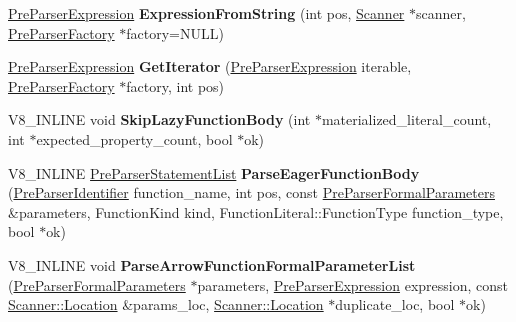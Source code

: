 \begin{DoxyCompactItemize}
\item 
\hyperlink{classv8_1_1internal_1_1_pre_parser_expression}{Pre\+Parser\+Expression} {\bfseries Expression\+From\+String} (int pos, \hyperlink{classv8_1_1internal_1_1_scanner}{Scanner} $\ast$scanner, \hyperlink{classv8_1_1internal_1_1_pre_parser_factory}{Pre\+Parser\+Factory} $\ast$factory=N\+U\+LL)\hypertarget{classv8_1_1internal_1_1_pre_parser_traits_a1ccbffc910f113613cdb48aeef0a8a7b}{}\label{classv8_1_1internal_1_1_pre_parser_traits_a1ccbffc910f113613cdb48aeef0a8a7b}

\item 
\hyperlink{classv8_1_1internal_1_1_pre_parser_expression}{Pre\+Parser\+Expression} {\bfseries Get\+Iterator} (\hyperlink{classv8_1_1internal_1_1_pre_parser_expression}{Pre\+Parser\+Expression} iterable, \hyperlink{classv8_1_1internal_1_1_pre_parser_factory}{Pre\+Parser\+Factory} $\ast$factory, int pos)\hypertarget{classv8_1_1internal_1_1_pre_parser_traits_a3c71f9a7541afb464a3e3766b78cded4}{}\label{classv8_1_1internal_1_1_pre_parser_traits_a3c71f9a7541afb464a3e3766b78cded4}

\item 
V8\+\_\+\+I\+N\+L\+I\+NE void {\bfseries Skip\+Lazy\+Function\+Body} (int $\ast$materialized\+\_\+literal\+\_\+count, int $\ast$expected\+\_\+property\+\_\+count, bool $\ast$ok)\hypertarget{classv8_1_1internal_1_1_pre_parser_traits_a44d0f342c2e7912190f30c05229afcba}{}\label{classv8_1_1internal_1_1_pre_parser_traits_a44d0f342c2e7912190f30c05229afcba}

\item 
V8\+\_\+\+I\+N\+L\+I\+NE \hyperlink{classv8_1_1internal_1_1_pre_parser_list}{Pre\+Parser\+Statement\+List} {\bfseries Parse\+Eager\+Function\+Body} (\hyperlink{classv8_1_1internal_1_1_pre_parser_identifier}{Pre\+Parser\+Identifier} function\+\_\+name, int pos, const \hyperlink{structv8_1_1internal_1_1_pre_parser_formal_parameters}{Pre\+Parser\+Formal\+Parameters} \&parameters, Function\+Kind kind, Function\+Literal\+::\+Function\+Type function\+\_\+type, bool $\ast$ok)\hypertarget{classv8_1_1internal_1_1_pre_parser_traits_a946b995ba60d63afe01dd3ad745f81d0}{}\label{classv8_1_1internal_1_1_pre_parser_traits_a946b995ba60d63afe01dd3ad745f81d0}

\item 
V8\+\_\+\+I\+N\+L\+I\+NE void {\bfseries Parse\+Arrow\+Function\+Formal\+Parameter\+List} (\hyperlink{structv8_1_1internal_1_1_pre_parser_formal_parameters}{Pre\+Parser\+Formal\+Parameters} $\ast$parameters, \hyperlink{classv8_1_1internal_1_1_pre_parser_expression}{Pre\+Parser\+Expression} expression, const \hyperlink{structv8_1_1internal_1_1_scanner_1_1_location}{Scanner\+::\+Location} \&params\+\_\+loc, \hyperlink{structv8_1_1internal_1_1_scanner_1_1_location}{Scanner\+::\+Location} $\ast$duplicate\+\_\+loc, bool $\ast$ok)\hypertarget{classv8_1_1internal_1_1_pre_parser_traits_a22ef216cdd195f63bed8e202fa54f2d2}{}\label{classv8_1_1internal_1_1_pre_parser_traits_a22ef216cdd195f63bed8e202fa54f2d2}


\end{DoxyCompactItemize}
